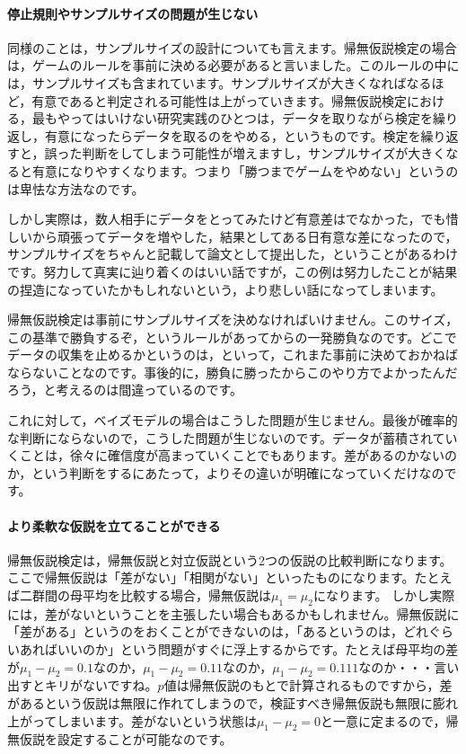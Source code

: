 \documentclass{ltjsbook}
\begin{document}
\paragraph{停止規則やサンプルサイズの問題が生じない}
同様のことは，サンプルサイズの設計についても言えます。帰無仮説検定の場合は，ゲームのルールを事前に決める必要があると言いました。このルールの中には，サンプルサイズも含まれています。サンプルサイズが大きくなればなるほど，有意であると判定される可能性は上がっていきます。帰無仮説検定における，最もやってはいけない研究実践のひとつは，データを取りながら検定を繰り返し，有意になったらデータを取るのをやめる，というものです。検定を繰り返すと，誤った判断をしてしまう可能性が増えますし，サンプルサイズが大きくなると有意になりやすくなります。つまり「勝つまでゲームをやめない」というのは卑怯な方法なのです。

しかし実際は，数人相手にデータをとってみたけど有意差はでなかった，でも惜しいから頑張ってデータを増やした，結果としてある日有意な差になったので，サンプルサイズをちゃんと記載して論文として提出した，ということがあるわけです。努力して真実に辿り着くのはいい話ですが，この例は努力したことが結果の捏造になっていたかもしれないという，より悲しい話になってしまいます。

帰無仮説検定は事前にサンプルサイズを決めなければいけません。このサイズ，この基準で勝負するぞ，というルールがあってからの一発勝負なのです。どこでデータの収集を止めるかというのは，といって，これまた事前に決めておかねばならないことなのです。事後的に，勝負に勝ったからこのやり方でよかったんだろう，と考えるのは間違っているのです。

これに対して，ベイズモデルの場合はこうした問題が生じません。最後が確率的な判断にならないので，こうした問題が生じないのです。データが蓄積されていくことは，徐々に確信度が高まっていくことでもあります。差があるのかないのか，という判断をするにあたって，よりその違いが明確になっていくだけなのです。

\paragraph{より柔軟な仮説を立てることができる}
帰無仮説検定は，帰無仮説と対立仮説という2つの仮説の比較判断になります。ここで帰無仮説は「差がない」「相関がない」といったものになります。たとえば二群間の母平均を比較する場合，帰無仮説は$\mu_1 = \mu_2$になります。
しかし実際には，差がないということを主張したい場合もあるかもしれません。帰無仮説に「差がある」というのをおくことができないのは，「あるというのは，どれぐらいあればいいのか」という問題がすぐに浮上するからです。たとえば母平均の差が$\mu_1 - \mu_2 = 0.1$なのか，$\mu_1 - \mu_2 = 0.11$なのか，$\mu_1 - \mu_2 = 0.111$なのか・・・言い出すとキリがないですね。$p$値は帰無仮説のもとで計算されるものですから，差があるという仮説は無限に作れてしまうので，検証すべき帰無仮説も無限に膨れ上がってしまいます。差がないという状態は$\mu_1 - \mu_2 = 0$と一意に定まるので，帰無仮説を設定することが可能なのです。
\end{document}

